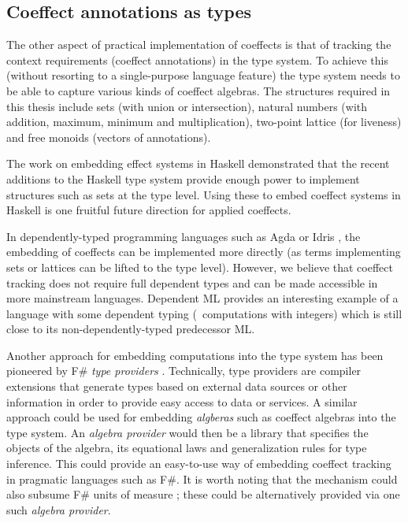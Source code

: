 
\subsection{Coeffect annotations as types}
\label{sec:unified-impl-types}

The other aspect of practical implementation of coeffects is that of tracking the context requirements
(coeffect annotations) in the type system. To achieve this (without resorting to a single-purpose
language feature) the type system needs to be able to capture various kinds of coeffect algebras. 
The structures required in this thesis include sets (with union or intersection), natural numbers (with 
addition, maximum, minimum and multiplication), two-point lattice (for liveness) and free monoids 
(vectors of annotations).

The work \cite{effects-embedding} on embedding effect systems in Haskell demonstrated that the
recent additions to the Haskell type system provide enough power to implement structures such
as sets at the type level. Using these to embed coeffect systems in Haskell is one fruitful 
future direction for applied coeffects.  

In dependently-typed programming languages such as Agda or Idris \cite{other-agda,other-idris},
the embedding of coeffects can be implemented more directly (as terms implementing sets or lattices
can be lifted to the type level). However, we believe that coeffect tracking does not require full 
dependent types and can be made accessible in more mainstream languages. Dependent ML 
\cite{types-dependent-ml} provides an interesting example of a language with some dependent typing 
(\eg~computations with integers) which is still close to its non-dependently-typed predecessor ML.

Another approach for embedding computations into the type system has been pioneered by F\#
\emph{type providers} \cite{app-inforich}. Technically, type providers are compiler extensions 
that generate types based on external data sources or other information in order to provide easy 
access to data or services. A similar approach could be used for embedding \emph{algberas} such
as coeffect algebras into the type system. An \emph{algebra provider} would then be a library that 
specifies the objects of the algebra, its equational laws and generalization rules for type inference.
This could provide an easy-to-use way of embedding coeffect tracking in pragmatic languages
such as F\#. It is worth noting that the mechanism could also subsume F\# units of measure
\cite{types-units-of-measure}; these could be alternatively provided via one such \emph{algebra
provider}.


